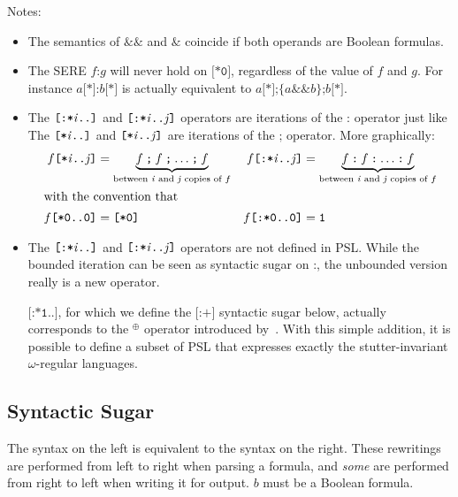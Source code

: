 \documentclass[a4paper,twoside,10pt,DIV=12]{scrreprt}
\newcommand{\AND}{\mathbin{\texttt{\&}}}
\newcommand{\ANDALT}{\mathbin{\texttt{\&\&}}}
\newcommand{\FUSION}{\mathbin{\texttt{:}}}
\newcommand{\CONCAT}{\mathbin{\texttt{;}}}
\newcommand{\0}{\texttt{0}}
\newcommand{\1}{\texttt{1}}
\newcommand{\STAR}[1]{\texttt{[*#1]}}
\newcommand{\FSTAR}[1]{\texttt{[:*#1]}}
\newcommand{\FPLUS}{\texttt{[:+]}}
\newcommand{\eword}{\texttt{[*0]}}
\newcommand{\sere}[1]{\texttt{\{}#1\texttt{\}}}
\newcommand\mvar[1]{\ensuremath{\mathit{#1}}}
\begin{document}
Notes:
\begin{itemize}
\item The semantics of $\ANDALT$ and $\AND$ coincide if both
operands are Boolean formulas.
\item The SERE $f\FUSION g$ will never hold on $\eword$,
  regardless of the value of $f$ and $g$.  For instance
  $a\STAR{}\FUSION b\STAR{}$ is actually equivalent to
  $a\STAR{}\CONCAT\sere{a\ANDALT b}\CONCAT b\STAR{}$.
\item The $\FSTAR{\mvar{i}..}$ and $\FSTAR{\mvar{i}..\mvar{j}}$ operators are
  iterations of the $\FUSION$ operator just like
  The $\STAR{\mvar{i}..}$ and $\STAR{\mvar{i}..\mvar{j}}$ are
  iterations of the $\CONCAT$ operator.  More graphically:
  \begin{align*}
    f\STAR{\mvar{i}..\mvar{j}} &=
    \underbrace{f\CONCAT f\CONCAT \ldots \CONCAT f}_{\text{between $\mvar{i}$ and $\mvar{j}$ copies of $f$}} &
    f\FSTAR{\mvar{i}..\mvar{j}} &=
    \underbrace{f\FUSION f\FUSION \ldots \FUSION f}_{\text{between $\mvar{i}$ and $\mvar{j}$ copies of $f$}}\\
    \intertext{with the convention that}
    f\STAR{0..0} &= \eword &
    f\FSTAR{0..0} &= \1
  \end{align*}
\item The $\FSTAR{\mvar{i}..}$ and $\FSTAR{\mvar{i}..\mvar{j}}$
  operators are not defined in PSL.  While the bounded iteration can
  be seen as syntactic sugar on $\FUSION$, the unbounded version
  really is a new operator.

  $\FSTAR{1..}$, for which we define the $\FPLUS$ syntactic sugar
  below, actually corresponds to the $^\oplus$ operator introduced
  by~\citet{dax.09.atva}.  With this simple addition, it is possible
  to define a subset of PSL that expresses exactly the
  stutter-invariant $\omega$-regular languages.
\end{itemize}

\subsection{Syntactic Sugar}

The syntax on the left is equivalent to the syntax on the right.
These rewritings are performed from left to right when parsing a
formula, and \emph{some} are performed from right to left when writing
it for output.  $b$ must be a Boolean formula.
\end{document}

